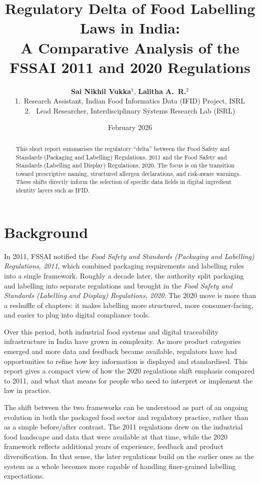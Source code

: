\documentclass[12pt,a4paper]{article}
\title{\textbf{Regulatory Delta of Food Labelling Laws in India:\\
A Comparative Analysis of the FSSAI 2011 and 2020 Regulations}}
\author{
\textbf{Sai Nikhil Vukka}$^{1}$, 
\textbf{Lalitha A.\ R.}$^{2}$ \\
\small
1.~Research Assistant, Indian Food Informatics Data (IFID) Project, ISRL \\
\small
2.~
Lead Researcher, Interdisciplinary Systems Research Lab (ISRL)
}
\date{February 2026}
\begin{document}
\maketitle

\begin{abstract}
This short report summarises the regulatory ``delta'' between the Food Safety and Standards (Packaging and Labelling) Regulations, 2011 and the Food Safety and Standards (Labelling and Display) Regulations, 2020.
The focus is on the transition toward prescriptive naming, structured allergen declarations, and risk-aware warnings.
These shifts directly inform the selection of specific data fields in digital ingredient identity layers such as IFID.
\end{abstract}

\section{Background}

In 2011, FSSAI notified the \emph{Food Safety and Standards (Packaging and Labelling) Regulations, 2011}, which combined packaging requirements and labelling rules into a single framework.\cite{fssai-2011}
Roughly a decade later, the authority split packaging and labelling into separate regulations and brought in the \emph{Food Safety and Standards (Labelling and Display) Regulations, 2020}.\cite{fssai-2020-labelling}
The 2020 move is more than a reshuffle of chapters: it makes labelling more structured, more consumer-facing, and easier to plug into digital compliance tools.\cite{fssai-2020-labelling,fssai-faq-2022,lanpub-india-fopl}

Over this period, both industrial food systems and digital traceability infrastructure in India have grown in complexity.\cite{frontpack-2011,icmrnin-hfss}
As more product categories emerged and more data and feedback became available, regulators have had opportunities to refine how key information is displayed and standardised.
This report gives a compact view of how the 2020 regulations shift emphasis compared to 2011, and what that means for people who need to interpret or implement the law in practice.

The shift between the two frameworks can be understood as part of an ongoing evolution in both the packaged food sector and regulatory practice, rather than as a simple before/after contrast.
The 2011 regulations drew on the industrial food landscape and data that were available at that time, while the 2020 framework reflects additional years of experience, feedback and product diversification.
In that sense, the later regulations build on the earlier ones as the system as a whole becomes more capable of handling finer-grained labelling expectations.
\end{document}

